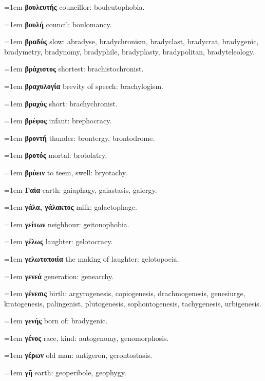 \hangindent=1em \textbf{βουλευτής} councillor: bouleutophobia.\par
\hangindent=1em \textbf{βουλή} council: boulomancy.\par
\hangindent=1em \textbf{βραδύς} slow: abradyse, bradychronism, bradyclast, bradycrat, bradygenic, bradymetry, bradynomy, bradyphile, bradyplasty, bradypolitan, bradyteleology.\par
\hangindent=1em \textbf{βράχιστος} shortest: brachistochronist.\par
\hangindent=1em \textbf{βραχυλογία} brevity of speech: brachylogism.\par
\hangindent=1em \textbf{βραχύς} short: brachychronist.\par
\hangindent=1em \textbf{βρέφος} infant: brephocracy.\par
\hangindent=1em \textbf{βροντή} thunder: brontergy, brontodrome.\par
\hangindent=1em \textbf{βροτός} mortal: brotolatry.\par
\hangindent=1em \textbf{βρύειν} to teem, swell: bryotachy.\par
\hangindent=1em \textbf{Γαῖα} earth: gaiaphagy, gaiastasis, gaiergy.\par
\hangindent=1em \textbf{γάλα, γάλακτος} milk: galactophage.\par
\hangindent=1em \textbf{γείτων} neighbour: geitonophobia.\par
\hangindent=1em \textbf{γέλως} laughter: gelotocracy.\par
\hangindent=1em \textbf{γελωτοποιία} the making of laughter: gelotopoeia.\par
\hangindent=1em \textbf{γενεά} generation: genearchy.\par
\hangindent=1em \textbf{γένεσις} birth: argyrogenesis, copiogenesis, drachmogenesis, genesiurge, kratogenesis, palingenist, plutogenesis, sophontogenesis, tachygenesis, urbigenesis.\par
\hangindent=1em \textbf{γενής} born of: bradygenic.\par
\hangindent=1em \textbf{γένος} race, kind: autogenomy, genomorphosis.\par
\hangindent=1em \textbf{γέρων} old man: antigeron, gerontostasis.\par
\hangindent=1em \textbf{γῆ} earth: geoperibole, geophygy.\par
